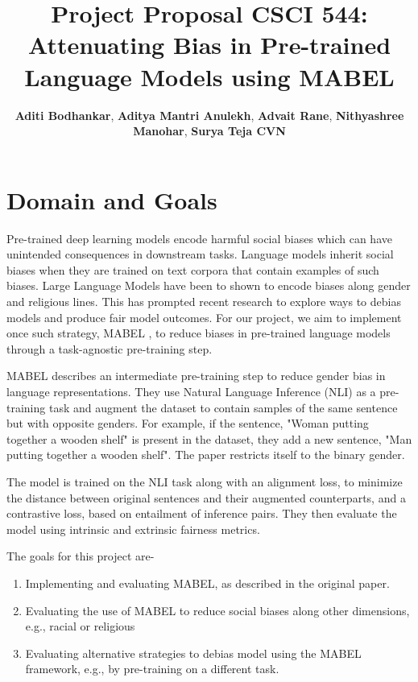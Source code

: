 \documentclass[11pt]{article}
\title{Project Proposal CSCI 544: Attenuating Bias in Pre-trained Language Models using MABEL}
\author{{\bf Aditi Bodhankar}, {\bf Aditya Mantri Anulekh}, {\bf Advait Rane}, {\bf Nithyashree Manohar}, {\bf Surya Teja CVN}}
\begin{document}
\maketitle

\section{Domain and Goals}
Pre-trained deep learning models encode harmful social biases which can have unintended consequences in downstream tasks. Language models inherit social biases when they are trained on text corpora that contain examples of such biases. Large Language Models have been to shown to encode biases along gender and religious lines. This has prompted recent research to explore ways to debias models and produce fair model outcomes. For our project, we aim to implement once such strategy, MABEL \cite{he2022mabel}, to reduce biases in pre-trained language models through a task-agnostic pre-training step.

MABEL describes an intermediate pre-training step to reduce gender bias in language representations. They use Natural Language Inference (NLI) as a pre-training task and augment the dataset to contain samples of the same sentence but with opposite genders. For example, if the sentence, "Woman putting together a wooden shelf" is present in the dataset, they add a new sentence, "Man putting together a wooden shelf". The paper restricts itself to the binary gender. 

The model is trained on the NLI task along with an alignment loss, to minimize the distance between original sentences and their augmented counterparts, and a contrastive loss, based on entailment of inference pairs. They then evaluate the model using intrinsic and extrinsic fairness metrics.

The goals for this project are-
\begin{enumerate}
    \item Implementing and evaluating MABEL, as described in the original paper.
    \item Evaluating the use of MABEL to reduce social biases along other dimensions, e.g., racial or religious
    \item Evaluating alternative strategies to debias model using the MABEL framework, e.g., by pre-training on a different task.
\end{enumerate}
\end{document}

